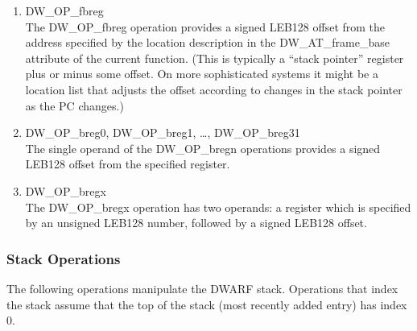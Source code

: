 \begin{enumerate}[1]

\item DW\_OP\_fbreg \\
The DW\_OP\_fbreg operation provides a signed LEB128 offset
from the address specified by the location description in the
DW\_AT\_frame\_base attribute of the current function. (This
is typically a “stack pointer” register plus or minus
some offset. On more sophisticated systems it might be a
location list that adjusts the offset according to changes
in the stack pointer as the PC changes.)

\item DW\_OP\_breg0, DW\_OP\_breg1, \dots, DW\_OP\_breg31\\
The single operand of the DW\_OP\_bregn operations provides
a signed LEB128 offset from
the specified register.

\item DW\_OP\_bregx \\
The DW\_OP\_bregx operation has two operands: a register
which is specified by an unsigned LEB128 number, followed by
a signed LEB128 offset.

\end{enumerate}


\subsubsection{Stack Operations}
\label{chap:stackoperations}
The following operations manipulate the DWARF stack. Operations
that index the stack assume that the top of the stack (most
recently added entry) has index 0.

